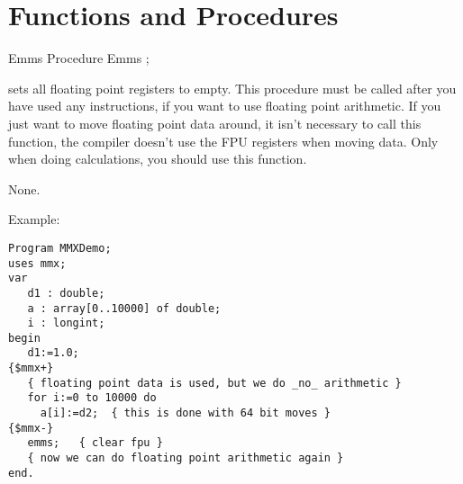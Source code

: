 \section{Functions and Procedures}
\begin{procedure}{Emms}
\Declaration
Procedure Emms ;

\Description
{} sets all floating point registers to empty. This procedure must
be called after you have used any  instructions, if you want to use
floating point arithmetic. If you just want to move floating point data
around, it isn't necessary to call this function, the compiler doesn't use
the FPU registers when moving data. Only when doing calculations, you should
use this function.

\Errors
None.
\SeeAlso
 \progref 
\end{procedure}
\begin{FPCList}
\item[Example:]
\begin{verbatim}
Program MMXDemo;
uses mmx;
var
   d1 : double;
   a : array[0..10000] of double;
   i : longint;
begin
   d1:=1.0;
{$mmx+}
   { floating point data is used, but we do _no_ arithmetic }
   for i:=0 to 10000 do
     a[i]:=d2;  { this is done with 64 bit moves }
{$mmx-}
   emms;   { clear fpu }
   { now we can do floating point arithmetic again }
end. 
\end{verbatim}
\end{FPCList}
